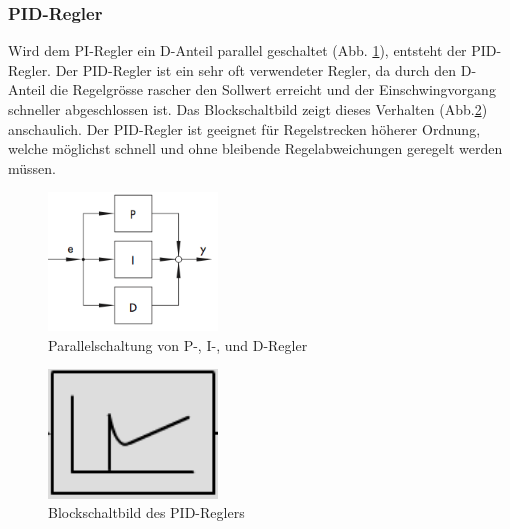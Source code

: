 \subsubsection{PID-Regler}
Wird    dem    PI-Regler    ein    D-Anteil    parallel    geschaltet    (Abb.
\ref{fig:PRDRegler1}), entsteht  der PID-Regler. Der  PID-Regler ist  ein sehr
oft verwendeter  Regler, da durch  den D-Anteil die Regelgr\"osse  rascher den
Sollwert erreicht  und der Einschwingvorgang schneller  abgeschlossen ist. Das
Blockschaltbild  zeigt dieses  Verhalten (Abb.\ref{fig:PID})  anschaulich. Der
PID-Regler  ist   geeignet  f\"ur  Regelstrecken  h\"oherer   Ordnung,  welche
m\"oglichst  schnell  und  ohne bleibende  Regelabweichungen  geregelt  werden
m\"ussen.

\begin{figure}[h!, width=\pagewidth]
    \centering
    \includegraphics[width=0.4\textwidth]{images/PRDRegler1}
    \caption{Parallelschaltung von P-, I-, und D-Regler}
    \label{fig:PRDRegler1}
\end{figure}

\begin{figure}[h!, width=\pagewidth]
    \centering
    \includegraphics[width=0.4\textwidth]{images/PID}
    \caption{Blockschaltbild des PID-Reglers}
    \label{fig:PID}
\end{figure}
